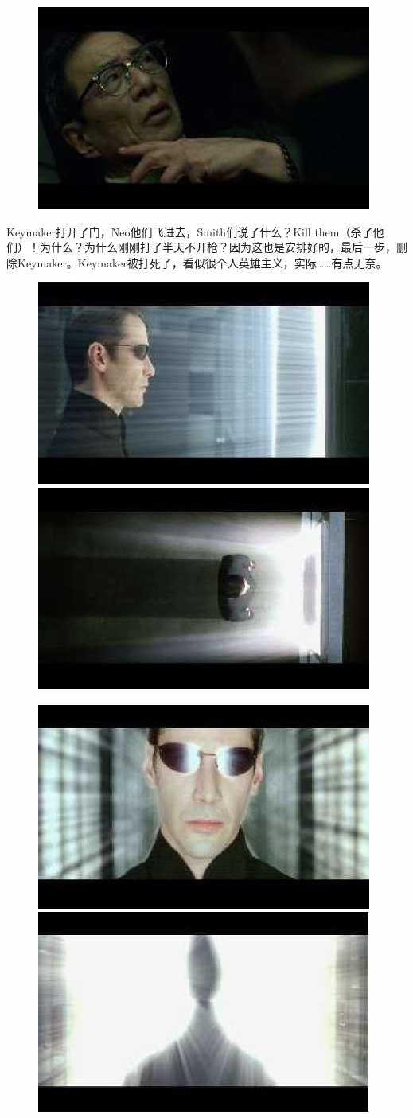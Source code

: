 \documentclass[UTF8]{ctexart}
\begin{document}
\begin{figure}[htb]
\centering
\includegraphics[width=0.5\linewidth]{fig/read_reloaded-153}
\end{figure}

Keymaker打开了门，Neo他们飞进去，Smith们说了什么？Kill them（杀了他们）！为什么？为什么刚刚打了半天不开枪？因为这也是安排好的，最后一步，删除Keymaker。Keymaker被打死了，看似很个人英雄主义，实际……有点无奈。

\begin{figure}[htb]
\centering
\includegraphics[width=0.45\linewidth]{fig/read_reloaded-154}
\includegraphics[width=0.45\linewidth]{fig/read_reloaded-154-1}

\vspace{3pt}

\includegraphics[width=0.45\linewidth]{fig/read_reloaded-154-2}
\includegraphics[width=0.45\linewidth]{fig/read_reloaded-154-3}
\end{figure}
\end{document}
